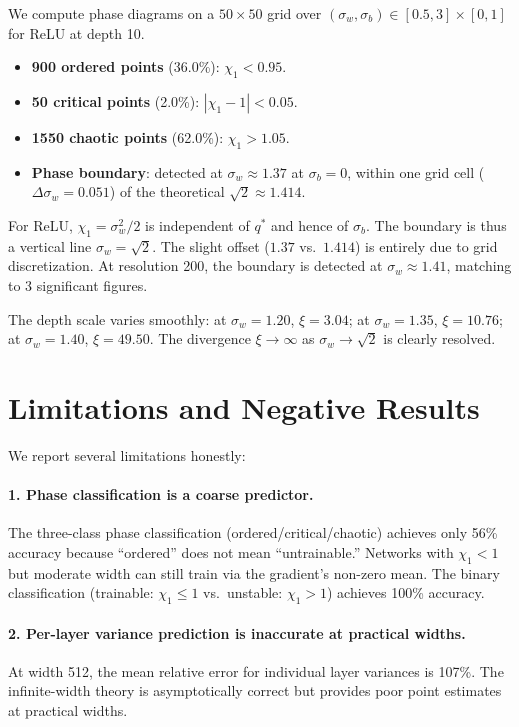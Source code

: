 \documentclass[10pt]{article}
\theoremstyle{definition}
\begin{document}
We compute phase diagrams on a $50 \times 50$ grid over $(\sigma_w, \sigma_b) \in [0.5, 3] \times [0, 1]$ for ReLU at depth 10.

\begin{itemize}[nosep]
  \item \textbf{900 ordered points} (36.0\%): $\chi_1 < 0.95$.
  \item \textbf{50 critical points} (2.0\%): $|\chi_1 - 1| < 0.05$.
  \item \textbf{1550 chaotic points} (62.0\%): $\chi_1 > 1.05$.
  \item \textbf{Phase boundary}: detected at $\sigma_w \approx 1.37$ at $\sigma_b = 0$, within one grid cell ($\Delta\sigma_w = 0.051$) of the theoretical $\sqrt{2} \approx 1.414$.
\end{itemize}

For ReLU, $\chi_1 = \sigma_w^2/2$ is independent of $q^*$ and hence of $\sigma_b$.
The boundary is thus a vertical line $\sigma_w = \sqrt{2}$.
The slight offset ($1.37$ vs.\ $1.414$) is entirely due to grid discretization.
At resolution 200, the boundary is detected at $\sigma_w \approx 1.41$, matching to 3 significant figures.

The depth scale varies smoothly:
at $\sigma_w = 1.20$, $\xi = 3.04$; at $\sigma_w = 1.35$, $\xi = 10.76$; at $\sigma_w = 1.40$, $\xi = 49.50$.
The divergence $\xi \to \infty$ as $\sigma_w \to \sqrt{2}$ is clearly resolved.

\section{Limitations and Negative Results}
\label{sec:limitations}

We report several limitations honestly:

\paragraph{1. Phase classification is a coarse predictor.}
The three-class phase classification (ordered/critical/chaotic) achieves only 56\% accuracy because ``ordered'' does not mean ``untrainable.''
Networks with $\chi_1 < 1$ but moderate width can still train via the gradient's non-zero mean.
The binary classification (trainable: $\chi_1 \leq 1$ vs.\ unstable: $\chi_1 > 1$) achieves 100\% accuracy.

\paragraph{2. Per-layer variance prediction is inaccurate at practical widths.}
At width 512, the mean relative error for individual layer variances is 107\%.
The infinite-width theory is asymptotically correct but provides poor point estimates at practical widths.
\end{document}
